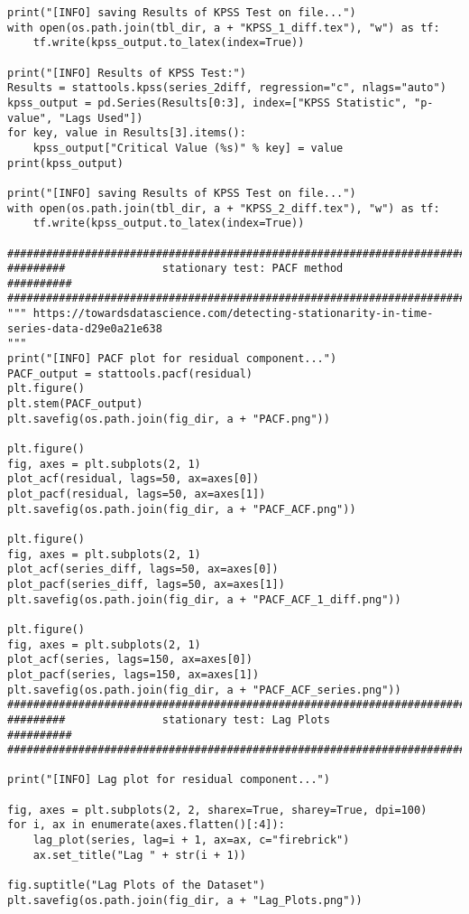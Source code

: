 \documentclass[12pt]{article}
\begin{document}
\begin{lstlisting}
print("[INFO] saving Results of KPSS Test on file...")
with open(os.path.join(tbl_dir, a + "KPSS_1_diff.tex"), "w") as tf:
    tf.write(kpss_output.to_latex(index=True))

print("[INFO] Results of KPSS Test:")
Results = stattools.kpss(series_2diff, regression="c", nlags="auto")
kpss_output = pd.Series(Results[0:3], index=["KPSS Statistic", "p-value", "Lags Used"])
for key, value in Results[3].items():
    kpss_output["Critical Value (%s)" % key] = value
print(kpss_output)

print("[INFO] saving Results of KPSS Test on file...")
with open(os.path.join(tbl_dir, a + "KPSS_2_diff.tex"), "w") as tf:
    tf.write(kpss_output.to_latex(index=True))

############################################################################
#########               stationary test: PACF method              ##########
############################################################################
""" https://towardsdatascience.com/detecting-stationarity-in-time-series-data-d29e0a21e638
"""
print("[INFO] PACF plot for residual component...")
PACF_output = stattools.pacf(residual)
plt.figure()
plt.stem(PACF_output)
plt.savefig(os.path.join(fig_dir, a + "PACF.png"))

plt.figure()
fig, axes = plt.subplots(2, 1)
plot_acf(residual, lags=50, ax=axes[0])
plot_pacf(residual, lags=50, ax=axes[1])
plt.savefig(os.path.join(fig_dir, a + "PACF_ACF.png"))

plt.figure()
fig, axes = plt.subplots(2, 1)
plot_acf(series_diff, lags=50, ax=axes[0])
plot_pacf(series_diff, lags=50, ax=axes[1])
plt.savefig(os.path.join(fig_dir, a + "PACF_ACF_1_diff.png"))

plt.figure()
fig, axes = plt.subplots(2, 1)
plot_acf(series, lags=150, ax=axes[0])
plot_pacf(series, lags=150, ax=axes[1])
plt.savefig(os.path.join(fig_dir, a + "PACF_ACF_series.png"))
############################################################################
#########               stationary test: Lag Plots                ##########
############################################################################

print("[INFO] Lag plot for residual component...")

fig, axes = plt.subplots(2, 2, sharex=True, sharey=True, dpi=100)
for i, ax in enumerate(axes.flatten()[:4]):
    lag_plot(series, lag=i + 1, ax=ax, c="firebrick")
    ax.set_title("Lag " + str(i + 1))

fig.suptitle("Lag Plots of the Dataset")
plt.savefig(os.path.join(fig_dir, a + "Lag_Plots.png"))



\end{lstlisting}
\end{document}
